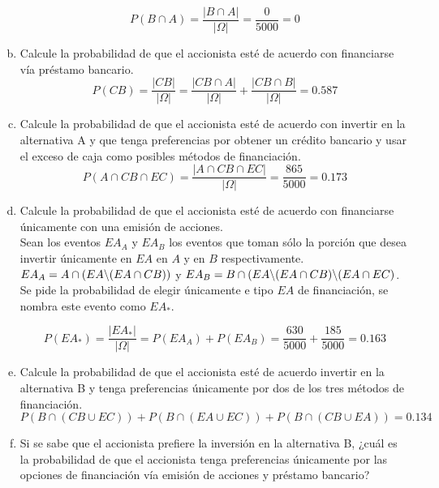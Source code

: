 \documentclass[11pt, spanish]{article}
\begin{document}
\begin{enumerate}[(a)]
$$P(B \cap A) = \frac{\left| B \cap A \right|}{\left| \Omega \right|} = \frac{0}{5000} = 0$$

\item Calcule la probabilidad de que el accionista esté de acuerdo con financiarse vía préstamo bancario.\\

$$P(CB) = \frac{\left| CB \right|}{\left| \Omega \right|} =  \frac{\left| CB \cap A \right|}{\left| \Omega \right|} + \frac{\left| CB \cap B \right|}{\left| \Omega \right|} = 0.587$$

\item Calcule la probabilidad de que el accionista esté de acuerdo con invertir en la alternativa A y que tenga preferencias por obtener un crédito bancario y usar el exceso de caja como posibles métodos de financiación.\\

$$P(A \cap CB \cap EC) = \frac{\left| A \cap CB \cap EC \right|}{\left| \Omega \right|} = \frac{865}{5000} = 0.173$$

\item Calcule la probabilidad de que el accionista esté de acuerdo con financiarse únicamente con una emisión de acciones.\\

Sean los eventos $EA_{A}$ y $EA_{B}$ los eventos que toman sólo la porción que desea invertir únicamente en $EA$ en $A$ y en $B$ respectivamente. $EA_{A} = A \cap (EA \char`\\ (EA \cap CB))$ y $EA_{B} = B \cap (EA \char`\\ (EA \cap CB) \char`\\ (EA \cap EC)$. Se pide la probabilidad de elegir únicamente e tipo $EA$ de financiación, se nombra este evento como $EA_{*}$.

$$P(EA_{*}) = \frac{\left| EA_{*} \right|}{\left| \Omega \right|} = P(EA_{A}) + P(EA_{B}) = \frac{630}{5000} + \frac{185}{5000} =  0.163$$

\item Calcule la probabilidad de que el accionista esté de acuerdo invertir en la alternativa B y tenga preferencias únicamente por dos de los tres métodos de financiación.
$$P(B \cap (CB \cup EC)) + P(B \cap (EA \cup EC)) + P(B \cap (CB \cup EA)) = 0.134$$

\item Si se sabe que el accionista prefiere la inversión en la alternativa B, ¿cuál es la probabilidad de que el accionista tenga preferencias únicamente por las opciones de financiación vía emisión de acciones y préstamo bancario?\\


\end{enumerate}
\end{document}

